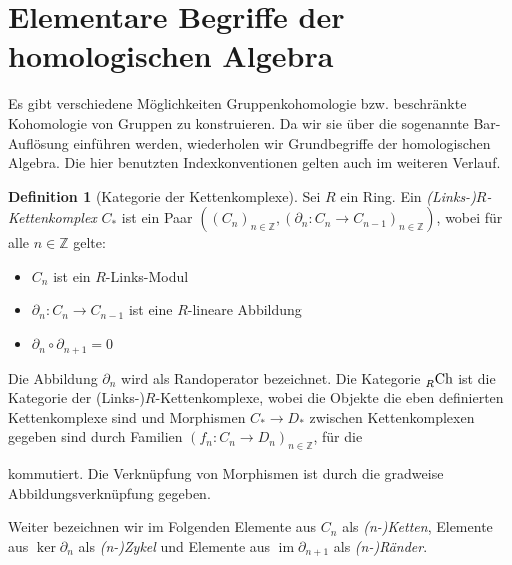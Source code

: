\documentclass[a4paper,twoside,10pt]{scrreprt}
\DeclareMathOperator{\img}{im}
\newcommand{\Z}{\mathbb{Z}}
\theoremstyle{definition}
\newtheorem{definition}[satz]{Definition}
\begin{document}
\section{Elementare Begriffe der homologischen Algebra}
Es gibt verschiedene Möglichkeiten Gruppenkohomologie bzw. beschränkte Kohomologie von Gruppen zu konstruieren. Da wir sie über die sogenannte Bar-Auflösung einführen werden, wiederholen wir Grundbegriffe der homologischen Algebra. Die hier benutzten Indexkonventionen gelten auch im weiteren Verlauf.
\begin{definition}[Kategorie der Kettenkomplexe]\label{def:CatChainComplex}
Sei $R$ ein Ring. Ein \emph{(Links-)$R$-Kettenkomplex} $C_*$ ist ein Paar $\left(\left(C_n \right)_{n\in \Z},\left(\partial_n:C_n\to C_{n-1}\right)_{n\in \Z}\right)$, wobei für alle $n\in \Z$ gelte:
\begin{itemize}
\item $C_n$ ist ein $R$-Links-Modul
\item $\partial_n:C_n\to C_{n-1}$ ist eine $R$-lineare Abbildung
\item $\partial_n\circ \partial_{n+1}=0$
\end{itemize}
Die Abbildung $\partial_n$ wird als Randoperator bezeichnet.
Die Kategorie $\prescript{}{R}{\text{Ch}}$ ist die Kategorie der (Links-)$R$-Kettenkomplexe, wobei die Objekte die eben definierten Kettenkomplexe sind und Morphismen $C_*\to D_*$ zwischen Kettenkomplexen gegeben sind durch Familien $(f_n:C_n\to D_n)_{n\in \Z}$, für die
\begin{center}
\end{center}
kommutiert. Die Verknüpfung von Morphismen ist durch die gradweise Abbildungsverknüpfung gegeben.\par
Weiter bezeichnen wir im Folgenden Elemente aus $C_n$ als \textit{(n-)Ketten}, Elemente aus $\ker\partial_n$ als \textit{(n-)Zykel} und Elemente aus $\img\partial_{n+1}$ als \textit{(n-)Ränder}.
\end{definition}
\end{document}

